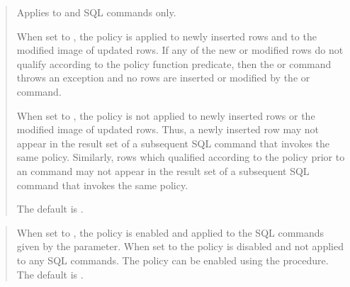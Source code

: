 \documentclass[letterpaper,10pt,english,openany,oneside]{sphinxmanual}
\begin{document}
\begin{quote}

Applies to  and  SQL commands only.

When set to , the policy is applied to newly inserted rows and to
the modified image of updated rows. If any of the new or modified rows
do not qualify according to the policy function predicate, then the
 or  command throws an exception and no rows are inserted or
modified by the  or  command.

When set to , the policy is not applied to newly inserted rows or
the modified image of updated rows. Thus, a newly inserted row may not
appear in the result set of a subsequent SQL command that invokes the
same policy. Similarly, rows which qualified according to the policy
prior to an  command may not appear in the result set of a
subsequent SQL command that invokes the same policy.

The default is .
\end{quote}

\begin{quote}

When set to , the policy is enabled and applied to the SQL commands
given by the  parameter. When set to  the policy
is disabled and not applied to any SQL commands. The policy can be
enabled using the  procedure. The default is .
\end{quote}
\end{document}
